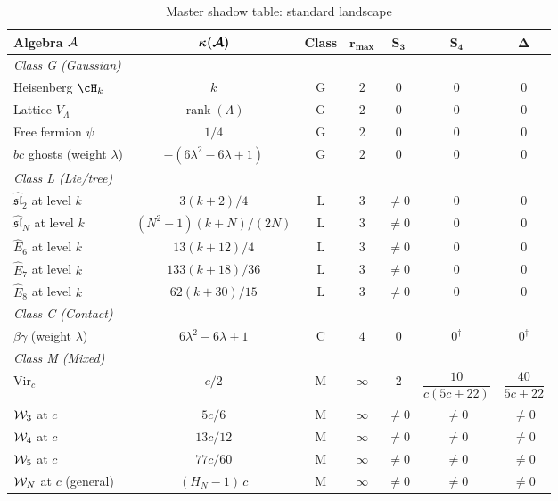 \begin{table}[ht]
\centering
\caption{Master shadow table: standard landscape}
\label{tab:master-shadow}
\renewcommand{\arraystretch}{1.35}
{\small
\begin{tabular}{lcccccc}
\toprule
\textbf{Algebra $\mathcal{A}$}
 & $\boldsymbol{\kappa(\mathcal{A})}$
 & \textbf{Class}
 & $\boldsymbol{r_{\max}}$
 & $\boldsymbol{S_3}$
 & $\boldsymbol{S_4}$
 & $\boldsymbol{\Delta}$ \\
\midrule
\multicolumn{7}{l}{\textit{Class G (Gaussian)}} \\[2pt]
Heisenberg $\cH_k$
 & $k$
 & G & $2$ & $0$ & $0$ & $0$ \\
Lattice $V_\Lambda$
 & $\operatorname{rank}(\Lambda)$
 & G & $2$ & $0$ & $0$ & $0$ \\
Free fermion $\psi$
 & $1/4$
 & G & $2$ & $0$ & $0$ & $0$ \\
$bc$ ghosts (weight $\lambda$)
 & $-(6\lambda^2{-}6\lambda{+}1)$
 & G & $2$ & $0$ & $0$ & $0$ \\[3pt]
\midrule
\multicolumn{7}{l}{\textit{Class L (Lie/tree)}} \\[2pt]
$\widehat{\mathfrak{sl}}_2$ at level $k$
 & $3(k{+}2)/4$
 & L & $3$
 & $\neq 0$ & $0$ & $0$ \\
$\widehat{\mathfrak{sl}}_N$ at level $k$
 & $(N^2{-}1)(k{+}N)/(2N)$
 & L & $3$
 & $\neq 0$ & $0$ & $0$ \\
$\widehat{E}_6$ at level $k$
 & $13(k{+}12)/4$
 & L & $3$
 & $\neq 0$ & $0$ & $0$ \\
$\widehat{E}_7$ at level $k$
 & $133(k{+}18)/36$
 & L & $3$
 & $\neq 0$ & $0$ & $0$ \\
$\widehat{E}_8$ at level $k$
 & $62(k{+}30)/15$
 & L & $3$
 & $\neq 0$ & $0$ & $0$ \\[3pt]
\midrule
\multicolumn{7}{l}{\textit{Class C (Contact)}} \\[2pt]
$\beta\gamma$ (weight $\lambda$)
 & $6\lambda^2{-}6\lambda{+}1$
 & C & $4$
 & $0$ & $0^\dagger$ & $0^\dagger$ \\[3pt]
\midrule
\multicolumn{7}{l}{\textit{Class M (Mixed)}} \\[2pt]
$\mathrm{Vir}_c$
 & $c/2$
 & M & $\infty$
 & $2$
 & $\dfrac{10}{c(5c{+}22)}$
 & $\dfrac{40}{5c{+}22}$ \\[8pt]
$\mathcal{W}_3$ at $c$
 & $5c/6$
 & M & $\infty$
 & $\neq 0$ & $\neq 0$ & $\neq 0$ \\
$\mathcal{W}_4$ at $c$
 & $13c/12$
 & M & $\infty$
 & $\neq 0$ & $\neq 0$ & $\neq 0$ \\
$\mathcal{W}_5$ at $c$
 & $77c/60$
 & M & $\infty$
 & $\neq 0$ & $\neq 0$ & $\neq 0$ \\
$\mathcal{W}_N$ at $c$ (general)
 & $(H_N{-}1)\,c$
 & M & $\infty$
 & $\neq 0$ & $\neq 0$ & $\neq 0$ \\
\bottomrule
\end{tabular}
}
\end{table}

